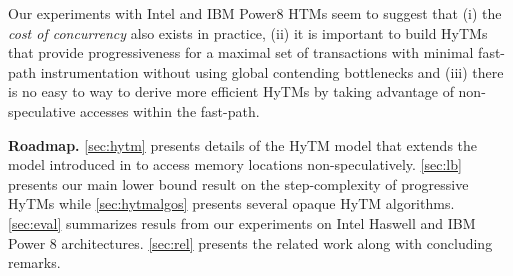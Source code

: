 Our experiments with Intel and IBM Power8 HTMs   
seem to suggest that (i) the \emph{cost of concurrency} also exists in practice, (ii) it is important to build HyTMs that provide progressiveness for a maximal set of transactions with minimal fast-path instrumentation
without using global contending bottlenecks and (iii) there is no easy to way to derive more efficient HyTMs by taking advantage of non-speculative accesses within the fast-path.


\vspace{1mm}\noindent\textbf{Roadmap.}
\cref{sec:hytm} presents details of the HyTM model that extends the model introduced in \cite{htmdisc15} 
to access memory locations non-speculatively.
\cref{sec:lb} presents our main lower bound result on the step-complexity of progressive HyTMs
while \cref{sec:hytmalgos} presents several opaque HyTM algorithms.
\cref{sec:eval} summarizes resuls from our experiments on Intel Haswell and IBM Power 8 architectures.
\cref{sec:rel} presents the related work along with concluding remarks.
%